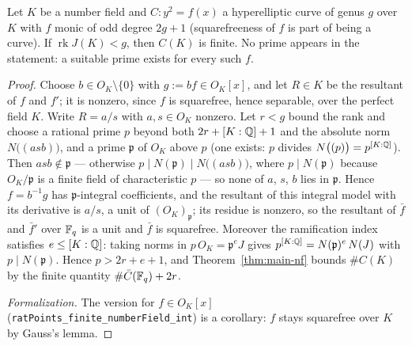 \begin{corollary}
\label{cor:finiteness-nf}
\leanok
Let $K$ be a number field and $C \colon y^2 = f(x)$ a hyperelliptic curve of genus $g$ over
$K$ with $f$ monic of odd degree $2g+1$ (squarefreeness of $f$ is part of being a curve). If
$\operatorname{rk} J(K) < g$, then $C(K)$ is finite. No prime appears in the
statement: a suitable prime exists for every such $f$.
\end{corollary}
\begin{proof}
\leanok
Choose $b \in O_K \setminus \{0\}$ with $g := b f \in O_K[x]$, and let $R \in K$ be the
resultant of $f$ and $f'$; it is nonzero, since $f$ is squarefree, hence separable, over
the perfect field $K$. Write $R = a/s$ with $a, s \in O_K$ nonzero. Let $r < g$ bound the
rank and choose a rational prime $p$ beyond both $2r + [K:\mathbb{Q}] + 1$ and the absolute norm
$N\bigl((asb)\bigr)$, and a prime $\mathfrak p$ of $O_K$ above $p$ (one exists: $p$
divides $N\bigl((p)\bigr) = p^{[K:\mathbb{Q}]}$). Then $asb \notin \mathfrak p$ --- otherwise
$p \mid N(\mathfrak p) \mid N\bigl((asb)\bigr)$, where $p \mid N(\mathfrak p)$ because
$O_K/\mathfrak p$ is a finite field of characteristic $p$ --- so none of $a$, $s$, $b$
lies in $\mathfrak p$. Hence $f = b^{-1} g$ has $\mathfrak p$-integral coefficients, and
the resultant of this integral model with its derivative is $a/s$, a unit of
$(O_K)_{\mathfrak p}$; its residue is nonzero, so the resultant of $\bar f$ and
$\bar f'$ over $\mathbb{F}_q$ is a unit and $\bar f$ is squarefree. Moreover the ramification
index satisfies $e \le [K:\mathbb{Q}]$: taking norms in $p\,O_K = \mathfrak p^e J$ gives
$p^{[K:\mathbb{Q}]} = N(\mathfrak p)^e\,N(J)$ with $p \mid N(\mathfrak p)$. Hence
$p > 2r + e + 1$, and Theorem~\ref{thm:main-nf} bounds $\#C(K)$ by the finite quantity
$\#\bar C(\mathbb{F}_q) + 2r$.

\emph{Formalization.} The version for $f \in O_K[x]$
(\texttt{ratPoints\_finite\_numberField\_int}) is a corollary: $f$ stays squarefree over
$K$ by Gauss's lemma.
\end{proof}
